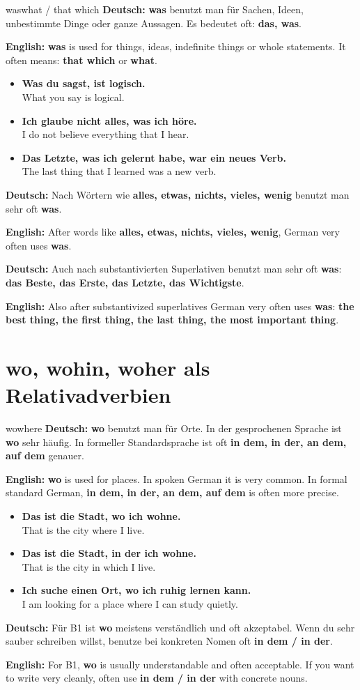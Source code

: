 \documentclass[a4paper,11pt]{article}
\newcommand{\GermanText}[1]{\textbf{Deutsch: }#1\par}
\newcommand{\EnglishText}[1]{{\small\color{SoftGray}\textbf{English: }#1\par}}
\newcommand{\ExampleItem}[2]{\item \textbf{#1}\\{\small\color{SoftGray}#2}}
\begin{document}
\begin{grammarentry}{was}{what / that which}
\GermanText{\textbf{was} benutzt man für Sachen, Ideen, unbestimmte Dinge oder ganze Aussagen. Es bedeutet oft: \textbf{das, was}.}
\EnglishText{\textbf{was} is used for things, ideas, indefinite things or whole statements. It often means: \textbf{that which} or \textbf{what}.}

\begin{exbox}
\begin{itemize}
    \ExampleItem{Was du sagst, ist logisch.}{What you say is logical.}
    \ExampleItem{Ich glaube nicht alles, was ich höre.}{I do not believe everything that I hear.}
    \ExampleItem{Das Letzte, was ich gelernt habe, war ein neues Verb.}{The last thing that I learned was a new verb.}
\end{itemize}
\end{exbox}

\GermanText{Nach Wörtern wie \textbf{alles, etwas, nichts, vieles, wenig} benutzt man sehr oft \textbf{was}.}
\EnglishText{After words like \textbf{alles, etwas, nichts, vieles, wenig}, German very often uses \textbf{was}.}

\GermanText{Auch nach substantivierten Superlativen benutzt man sehr oft \textbf{was}: \textbf{das Beste, das Erste, das Letzte, das Wichtigste}.}
\EnglishText{Also after substantivized superlatives German very often uses \textbf{was}: \textbf{the best thing, the first thing, the last thing, the most important thing}.}
\end{grammarentry}

\section{wo, wohin, woher als Relativadverbien}

\begin{grammarentry}{wo}{where}
\GermanText{\textbf{wo} benutzt man für Orte. In der gesprochenen Sprache ist \textbf{wo} sehr häufig. In formeller Standardsprache ist oft \textbf{in dem, in der, an dem, auf dem} genauer.}
\EnglishText{\textbf{wo} is used for places. In spoken German it is very common. In formal standard German, \textbf{in dem, in der, an dem, auf dem} is often more precise.}

\begin{exbox}
\begin{itemize}
    \ExampleItem{Das ist die Stadt, wo ich wohne.}{That is the city where I live.}
    \ExampleItem{Das ist die Stadt, in der ich wohne.}{That is the city in which I live.}
    \ExampleItem{Ich suche einen Ort, wo ich ruhig lernen kann.}{I am looking for a place where I can study quietly.}
\end{itemize}
\end{exbox}

\GermanText{Für B1 ist \textbf{wo} meistens verständlich und oft akzeptabel. Wenn du sehr sauber schreiben willst, benutze bei konkreten Nomen oft \textbf{in dem / in der}.}
\EnglishText{For B1, \textbf{wo} is usually understandable and often acceptable. If you want to write very cleanly, often use \textbf{in dem / in der} with concrete nouns.}
\end{grammarentry}
\end{document}
